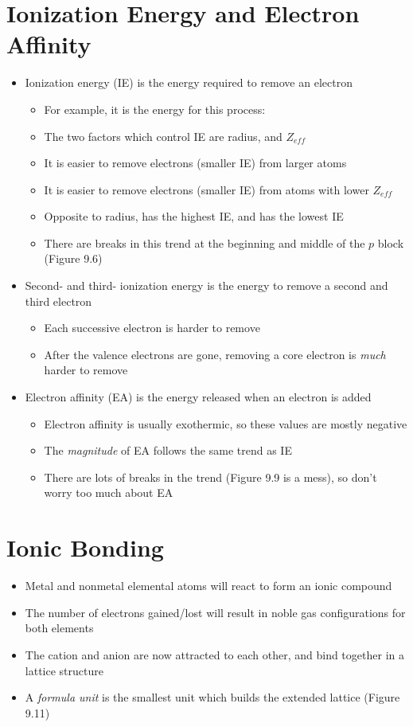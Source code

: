 \documentclass[12pt, openany, letterpaper]{memoir}
\begin{document}
\section{Ionization Energy and Electron Affinity}
\begin{itemize}
	\item Ionization energy (IE) is the energy required to remove an electron
	\begin{itemize}
		\item For example, it is the energy for this process: 
		\item The two factors which control IE are radius, and $Z_{eff}$
		\item It is easier to remove electrons (smaller IE) from larger atoms 
		\item It is easier to remove electrons (smaller IE) from atoms with lower $Z_{eff}$
		\item Opposite to radius,  has the highest IE, and  has the lowest IE 
		\item There are breaks in this trend at the beginning and middle of the $p$ block (Figure 9.6)
	\end{itemize}
	\item Second- and third- ionization energy is the energy to remove a second and third electron
	\begin{itemize}
		\item Each successive electron is harder to remove
		\item After the valence electrons are gone, removing a core electron is \emph{much} harder to remove
	\end{itemize}
	\item Electron affinity (EA) is the energy released when an electron is added
	\begin{itemize}
		\item Electron affinity is usually exothermic, so these values are mostly negative
		\item The \emph{magnitude} of EA follows the same trend as IE
		\item There are lots of breaks in the trend (Figure 9.9 is a mess), so don't worry too much about EA
	\end{itemize}
\end{itemize}
\section{Ionic Bonding}
\begin{itemize}
	\item Metal and nonmetal elemental atoms will react to form an ionic compound	
	\item The number of electrons gained/lost will result in noble gas configurations for both elements
	\item The cation and anion are now attracted to each other, and bind together in a lattice structure
	\item A \emph{formula unit} is the smallest unit which builds the extended lattice (Figure 9.11)
\end{itemize}
\end{document}
